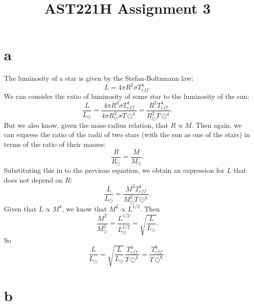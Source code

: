 \documentclass[11pt]{article}
\title{\vspace{-2cm}AST221H Assignment 3\vspace{-2cm}}
\date{}
\begin{document}
	
    \hypertarget{a}{%
\section*{a}\label{a}}

The luminosity of a star is given by the Stefan-Boltzmann law:
\[L = 4\pi R^2\sigma T_{eff}^4.\] We can consider the ratio of
luminosity of some star to the luminosity of the sun:
\[\frac{L}{L_\odot} = \frac{4\pi R^2\sigma T_{eff}^4}{4\pi R_\odot^2\sigma T\odot^4} = \frac{R^2 T_{eff}^4}{R_\odot^2 T\odot^4}.\]
But we also know, given the mass-radius relation, that \(R \propto M.\)
Then again, we can express the ratio of the radii of two stars (with the
sun as one of the stars) in terms of the ratio of their masses:
\[\frac{R}{R_\odot} = \frac{M}{M_\odot}.\] Substituting this in to the
previous equation, we obtain an expression for \(L\) that does not
depend on \(R\):
\[\frac{L}{L_\odot} = \frac{M^2T_{eff}^4}{M_\odot^2 T\odot^4}.\] Given
that \(L \propto M^4\), we know that \(M^2 \propto L^{1/2}.\) Then
\[\frac{M^2}{M_\odot^2} = \frac{L^{1/2}}{L_\odot^{1/2}} = \sqrt{\frac{L}{L_\odot}}.\]
So
\[\frac{L}{L_\odot} = \sqrt{\frac{L}{L_\odot}}\frac{T_{eff}^4}{T\odot^4} = \frac{T_{eff}^8}{T\odot^8}.\]

    \hypertarget{b}{%
\section*{b}\label{b}}
\end{document}

